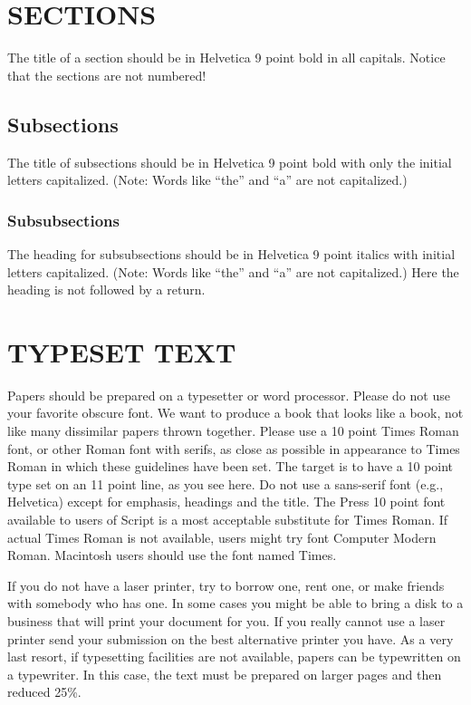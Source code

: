 \section{SECTIONS}
The title of a section should be in Helvetica 9 point bold in all 
capitals.  Notice that the sections are not numbered!  

\subsection{Subsections}
The title of subsections should be in Helvetica 9 point bold with only 
the initial letters capitalized. (Note: Words like ``the'' and ``a'' 
are not capitalized.)

\subsubsection{Subsubsections}
The heading 
for subsubsections should be in Helvetica 9 point italics with initial 
letters capitalized. (Note: Words like ``the'' and ``a'' are not 
capitalized.)  Here the heading is not followed by a return.


\section{TYPESET TEXT}
Papers should be prepared on a typesetter or word processor.  Please 
do not use your favorite obscure font.  We want to produce a book that 
looks like a book, not like many dissimilar papers thrown together.  
Please use a 10 point Times Roman font, or other Roman font with 
serifs, as close as possible in appearance to Times Roman in which 
these guidelines have been set.  The target is to have a 10 point type 
set on an 11 point line, as you see here.  Do not use a sans-serif 
font (e.g., {Helvetica)} except for emphasis, headings and 
the title.  The Press 10 point font available to users of Script is a 
most acceptable substitute for Times Roman.  If actual Times Roman is 
not available, users might try font Computer Modern Roman.  Macintosh 
users should use the font named Times.

If you do not have a laser printer, try to borrow 
one, rent one, or make friends with somebody who has one.  In some 
cases you might be able to bring a disk to a business that will print 
your document for you.   If you really cannot use a laser printer send 
your submission on the best alternative printer you have.  As a very 
last resort, if typesetting facilities are not available, papers can 
be typewritten on a typewriter.  In this case, the text must be 
prepared on larger pages and then reduced 25\%.  



